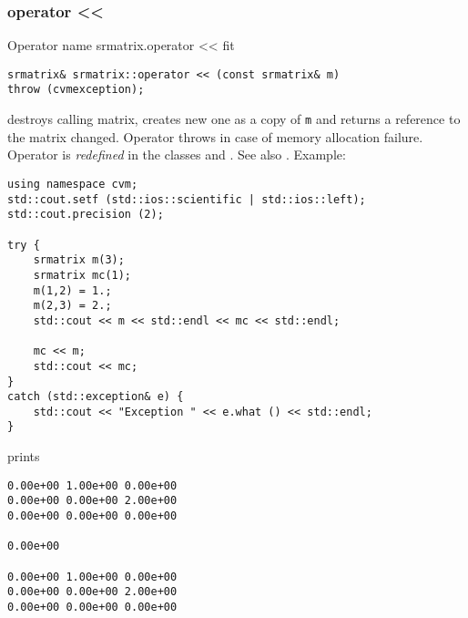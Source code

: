 \subsubsection{operator <{}<}
Operator%
\pdfdest name {srmatrix.operator <<} fit
\begin{verbatim}
srmatrix& srmatrix::operator << (const srmatrix& m)
throw (cvmexception);
\end{verbatim}
destroys  calling matrix, creates  new one as a copy of \verb"m"
and returns a reference to
the matrix changed.
Operator throws  
in case of memory allocation failure.
Operator is \emph{redefined} in the classes
and .
See also .
Example:
\begin{Verbatim}
using namespace cvm;
std::cout.setf (std::ios::scientific | std::ios::left); 
std::cout.precision (2);

try {
    srmatrix m(3);
    srmatrix mc(1);
    m(1,2) = 1.;
    m(2,3) = 2.;
    std::cout << m << std::endl << mc << std::endl;

    mc << m;
    std::cout << mc;
}
catch (std::exception& e) {
    std::cout << "Exception " << e.what () << std::endl;
}
\end{Verbatim}
prints
\begin{Verbatim}
0.00e+00 1.00e+00 0.00e+00
0.00e+00 0.00e+00 2.00e+00
0.00e+00 0.00e+00 0.00e+00

0.00e+00

0.00e+00 1.00e+00 0.00e+00
0.00e+00 0.00e+00 2.00e+00
0.00e+00 0.00e+00 0.00e+00
\end{Verbatim}
\newpage



